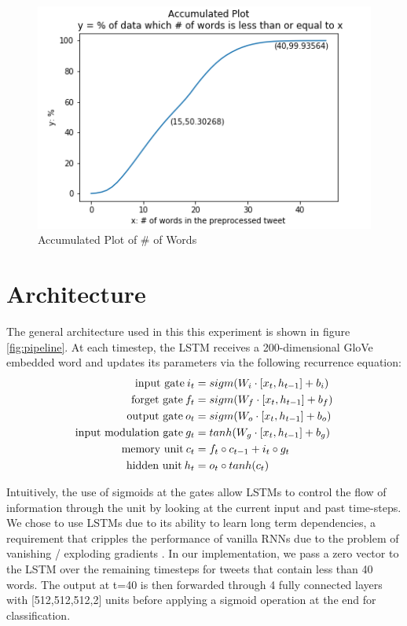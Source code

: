 \documentclass[10pt,conference,compsocconf]{IEEEtran}
\begin{document}
\begin{figure}[t]
\begin{center}
  \includegraphics[width=\columnwidth]{num_words_distribution1.PNG}
  \caption{Accumulated Plot of \# of Words}
  \label{fig:num_words_distribution1}
\end{center}
\end{figure}

\section{Architecture} 

The general architecture used in this this experiment is shown in figure \ref{fig:pipeline}. At each timestep, the LSTM \cite{lstm} receives a 200-dimensional GloVe embedded word and updates its parameters via the following recurrence equation:
\begin{align*}
\textnormal{input gate} \: i_t &= sigm(W_i \cdot [x_t, h_{t-1}] + b_i) \\
\textnormal{forget gate} \: f_t &= sigm(W_f \cdot [x_t, h_{t-1}] + b_f) \\
\textnormal{output gate} \: o_t &= sigm(W_o \cdot [x_t, h_{t-1}] + b_o) \\
\textnormal{input modulation gate} \: g_t &= tanh(W_g \cdot [x_t, h_{t-1}] + b_g) \\
\textnormal{memory unit} \: c_t &= f_t \circ c_{t-1} + i_t \circ g_t \\
\textnormal{hidden unit} \: h_t &= o_t \circ tanh(c_t) \\
\end{align*}

Intuitively, the use of sigmoids at the gates allow LSTMs to control the flow of information through the unit by looking at the current input and past time-steps. We chose to use LSTMs due to its ability to learn long term dependencies, a requirement that cripples the performance of vanilla RNNs due to the problem of vanishing / exploding gradients \cite{explodingvanishinggradient1,explodingvanishinggradient2}. In our implementation, we pass a zero vector to the LSTM over the remaining timesteps for tweets that contain less than 40 words. The output at t=40 is then forwarded through 4 fully connected layers with [512,512,512,2] units before applying a sigmoid operation at the end for classification.
\end{document}
